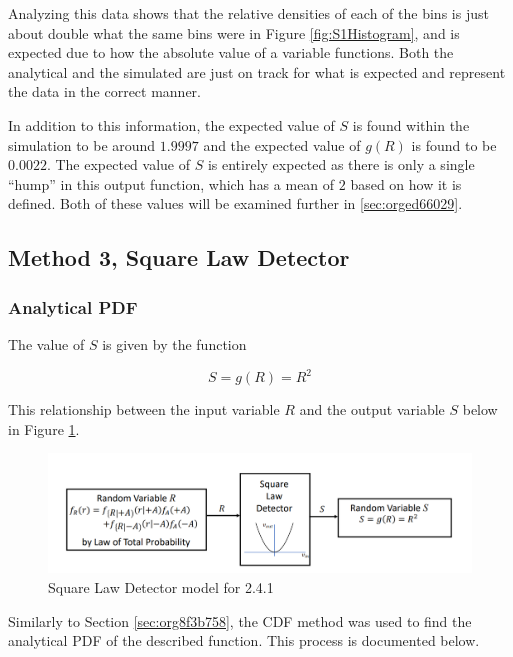 \documentclass[a4paper, 11pt]{article}
\begin{document}
\bigskip
\noindent
Analyzing this data shows that the relative densities of each of the bins is just about double what the same bins were in Figure \ref{fig:S1Histogram}, and is expected due to how the absolute value of a variable functions.
Both the analytical and the simulated are just on track for what is expected and represent the data in the correct manner.

\bigskip
\noindent
In addition to this information, the expected value of \(S\) is found within the simulation to be around \(1.9997\) and the expected value of \(g(R)\) is found to be \(0.0022\).
The expected value of \(S\) is entirely expected as there is only a single ``hump'' in this output function, which has a mean of \(2\) based on how it is defined.
Both of these values will be examined further in \ref{sec:orged66029}.

\subsection{Method 3, Square Law Detector}
\label{sec:org2e1d02d}
\subsubsection{Analytical PDF}
\label{sec:org92a4c94}
The value of \(S\) is given by the function

\begin{equation}
\label{eqn:S3}
    S = g(R) = R^2
\end{equation}

\bigskip
\noindent
This relationship between the input variable \(R\) and the output variable \(S\) below in Figure \ref{fig:DiagramSLD}.

\begin{figure}[htbp]
\centering
\includegraphics[width=.9\linewidth]{./Images/DiagramSLD.png}
\caption{\label{fig:DiagramSLD}Square Law Detector model for 2.4.1}
\end{figure}

\noindent
Similarly to Section \ref{sec:org8f3b758}, the CDF method was used to find the analytical PDF of the described function. This process is documented below.
\end{document}

